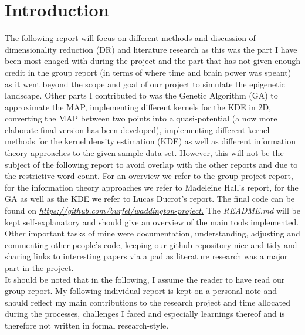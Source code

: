 \documentclass[journal, a4paper]{IEEEtran}
\begin{document}
\section{Introduction}
The following report will focus on different methods and discussion of dimensionality reduction (DR) and literature research as this was the part I have been most enaged with during the project and the part that has not given enough credit in the group report (in terms of where time and brain power was speant) as it went beyond the scope and goal of our project to simulate the epigenetic landscape.
Other parts I contributed to was the Genetic Algorithm (GA) to approximate the MAP, implementing different kernels for the KDE in 2D, converting the MAP between two points into a quasi-potential (a now more elaborate final version has been developed), implementing different kernel methods for the kernel density estimation (KDE) as well as different information theory approaches to the given sample data set. However, this will not be the subject of the following report to avoid overlap with the other reports and due to the restrictive word count. For an overview we refer to the group project report, for the information theory approaches we refer to Madeleine Hall's report, for the GA as well as the KDE we refer to Lucas Ducrot's report. The final code can be found on 
\textit{\url{https://github.com/burfel/waddington-project.}}
The \textit{README.md} will be kept self-explanatory and should give an overview of the main tools implemented. \\
Other important tasks of mine were documentation, understanding, adjusting and commenting other people's code, keeping our github repository nice and tidy and sharing links to interesting papers via a pad as literature research was a major part in the project. \\

It should be noted that in the following, I assume the reader to have read our group report. My following individual report is kept on a personal note and should reflect my main contributions to the research project and time allocated during the processes, challenges I faced and especially learnings thereof and is therefore not written in formal research-style. \\
\end{document}
